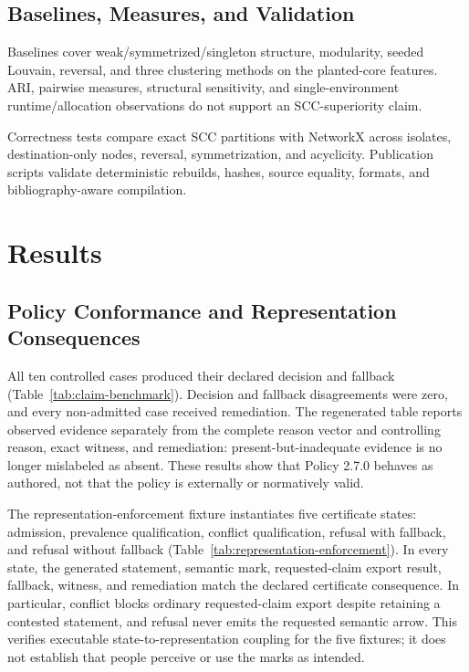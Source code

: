 \documentclass[manuscript,screen,review]{acmart}
\begin{document}
\subsection{Baselines, Measures, and Validation}

Baselines cover weak/symmetrized/singleton structure, modularity, seeded Louvain, reversal, and three clustering methods on the planted-core features. ARI, pairwise measures, structural sensitivity, and single-environment runtime/allocation observations do not support an SCC-superiority claim.

Correctness tests compare exact SCC partitions with NetworkX across isolates, destination-only nodes, reversal, symmetrization, and acyclicity. Publication scripts validate deterministic rebuilds, hashes, source equality, formats, and bibliography-aware compilation.

\section{Results}

\subsection{Policy Conformance and Representation Consequences}

All ten controlled cases produced their declared decision and fallback (Table~\ref{tab:claim-benchmark}). Decision and fallback disagreements were zero, and every non-admitted case received remediation. The regenerated table reports observed evidence separately from the complete reason vector and controlling reason, exact witness, and remediation: present-but-inadequate evidence is no longer mislabeled as absent. These results show that Policy 2.7.0 behaves as authored, not that the policy is externally or normatively valid.



The representation-enforcement fixture instantiates five certificate states: admission, prevalence qualification, conflict qualification, refusal with fallback, and refusal without fallback (Table~\ref{tab:representation-enforcement}). In every state, the generated statement, semantic mark, requested-claim export result, fallback, witness, and remediation match the declared certificate consequence. In particular, conflict blocks ordinary requested-claim export despite retaining a contested statement, and refusal never emits the requested semantic arrow. This verifies executable state-to-representation coupling for the five fixtures; it does not establish that people perceive or use the marks as intended.
\end{document}
